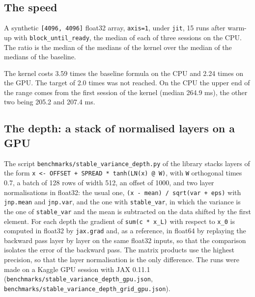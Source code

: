 \documentclass[11pt]{article}
\begin{document}
\subsection{The speed}

A synthetic \texttt{[4096, 4096]} float32 array, \texttt{axis=1}, under \texttt{jit}, 15 runs after warm-up with \texttt{block\_until\_ready}, the median of each of three sessions on the CPU. The ratio is the median of the medians of the kernel over the median of the medians of the baseline.

\begin{table}[H]
\centering
\small
{}
\end{table}

The kernel costs 3.59 times the baseline formula on the CPU and 2.24 times on the GPU. The target of 2.0 times was not reached. On the CPU the upper end of the range comes from the first session of the kernel (median 264.9 ms), the other two being 205.2 and 207.4 ms.

\subsection{The depth: a stack of normalised layers on a GPU}

The script \texttt{benchmarks/stable\_variance\_depth.py} of the library stacks layers of the form \texttt{x <- OFFSET + SPREAD * tanh(LN(x) @ W)}, with \texttt{W} orthogonal times 0.7, a batch of 128 rows of width 512, an offset of 1000, and two layer normalisations in float32: the usual one, \texttt{(x - mean) / sqrt(var + eps)} with \texttt{jnp.mean} and \texttt{jnp.var}, and the one with \texttt{stable\_var}, in which the variance is the one of \texttt{stable\_var} and the mean is subtracted on the data shifted by the first element. For each depth the gradient of \texttt{sum(c * x\_L)} with respect to \texttt{x\_0} is computed in float32 by \texttt{jax.grad} and, as a reference, in float64 by replaying the backward pass layer by layer on the same float32 inputs, so that the comparison isolates the error of the backward pass. The matrix products use the highest precision, so that the layer normalisation is the only difference. The runs were made on a Kaggle GPU session with JAX 0.11.1 (\texttt{benchmarks/stable\_variance\_depth\_gpu.json}, \texttt{benchmarks/stable\_variance\_depth\_grid\_gpu.json}).
\end{document}

